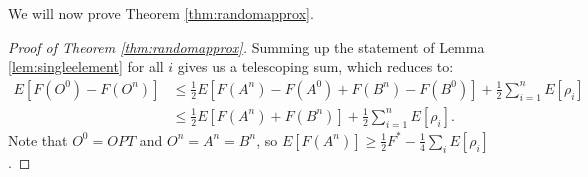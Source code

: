 \begin{comment}

(\xinghao{Note} If we weaken the assumption of $\Delta_+(i) \leq \Delta_+^{\max}(i)$ to $\Delta_+(i) \leq \Delta_+^{\max}(i) + \epsilon_i$, then in Case 6 above, we can instead bound
\begin{align*}
E[F(O^{i-1})-F(O^i)|A^{i-1}, j]
&\leq \frac{\Delta_+^{\max}(i) \Delta_-^{\max}(i) + \epsilon\max(\Delta_+^{\max}(i), \Delta_-^{\max})}{\Delta_+^{\max}(i) + \Delta_-^{\max}(i)}\\
&\leq \frac{\Delta_+^{\max}(i) \Delta_-^{\max}(i) + \epsilon(\Delta_+^{\max}(i) + \Delta_-^{\max})}{\Delta_+^{\max}(i) + \Delta_-^{\max}(i)}.
\end{align*}
The bound of Lemma \ref{lem:singleelement} becomes
\[E[F(O^{i-1})-F(O^i)] \leq \frac{1}{2} E[F(A^i) - F(A^{i-1}) + F(B^i) - F(B^{i-1}) + \rho_i + 2\epsilon_i],\]
and the bound of Theorem \ref{thm:randomapprox} becomes $E[F(A)] \geq \frac{1}{2} F^* - \frac{1}{4}\sum_iE[\rho_i + 2\epsilon_i]$.
)

\end{comment}







We will now prove Theorem \ref{thm:randomapprox}.

\begin{proof} [Proof of Theorem \ref{thm:randomapprox}]
Summing up the statement of Lemma \ref{lem:singleelement} for all $i$ gives us a telescoping sum, which reduces to:
\begin{align*}
E[F(O^0)-F(O^n)]
&\leq \frac{1}{2} E[F(A^n) - F(A^0) + F(B^n) - F(B^0)] + \frac{1}{2}\sum_{i=1}^nE[\rho_i]\\
&\leq \frac{1}{2} E[F(A^n) + F(B^n)] + \frac{1}{2}\sum_{i=1}^nE[\rho_i].
\end{align*}
Note that $O^0 = OPT$ and $O^n = A^n = B^n$, so $E[F(A^n)] \geq \frac{1}{2} F^* - \frac{1}{4}\sum_iE[\rho_i]$.
\end{proof}









